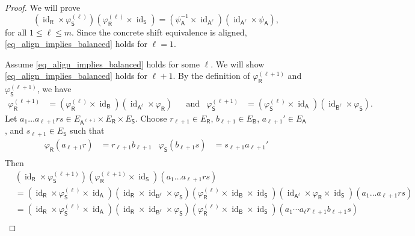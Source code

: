 \documentclass[11pt, letterpaper,final]{amsart}
\newcommand{\id}{\operatorname{id}}
\theoremstyle{definition}
\begin{document}
\begin{proof}
We will prove
\begin{equation}\label{eq_align_implies_balanced}
 (\id_\mathsf{R} \times \varphi_\mathsf{S}^{(\ell)}) (\varphi_\mathsf{R}^{(\ell)} \times\id_\mathsf{S})=(\psi_\mathsf{A}^{-1} \times \id_{\mathsf{A}^\ell})(\id_{\mathsf{A}^\ell} \times \psi_\mathsf{A}),
\end{equation}
for all $1 \leq \ell \leq m$.  Since the concrete shift equivalence is aligned, \eqref{eq_align_implies_balanced} holds for $\ell=1$.  

Assume \eqref{eq_align_implies_balanced} holds for some $\ell$.  We will show \eqref{eq_align_implies_balanced} holds for $\ell+1$.  By the definition of $\varphi_\mathsf{R}^{(\ell+1)}$ and $\varphi_\mathsf{S}^{(\ell+1)}$, we have 
\begin{align*}
\varphi_\mathsf{R}^{(\ell+1)} &= (\varphi_\mathsf{R}^{ (\ell) } \times \id_\mathsf{B} ) ( \id_{\mathsf{A}^\ell} \times \varphi_\mathsf{R})  & & \text{and} &  \varphi_\mathsf{S}^{(\ell+1)} &= (\varphi_\mathsf{S}^{ (\ell) } \times \id_\mathsf{A} ) ( \id_{\mathsf{B}^\ell} \times \varphi_\mathsf{S}).
\end{align*}
Let $a_1\ldots a_{\ell+1} rs \in E_{\mathsf{A}^{\ell+1} } \times E_\mathsf{R} \times E_\mathsf{S}$.  Choose $r_{\ell+1}\in E_{\mathsf{R}}$, $b_{\ell+1} \in E_\mathsf{B}$, $a_{\ell+1} ' \in E_\mathsf{A}$,  and $ s_{\ell+1} \in E_\mathsf{S}$ such that 
\begin{align*}
\varphi_\mathsf{R}( a_{\ell+1} r) &= r_{\ell+1} b_{\ell+1}  & \varphi_\mathsf{S} ( b_{\ell+1} s ) &= s_{\ell+1} a_{\ell+1}' \\
\end{align*}
Then 
\begin{align*}
&(\id_\mathsf{R} \times \varphi_\mathsf{S}^{(\ell+1)})(\varphi_\mathsf{R}^{(\ell+1)} \times\id_\mathsf{S}) (a_1\ldots a_{\ell+1} rs )\\
&= (\id_\mathsf{R} \times \varphi_\mathsf{S}^{ (\ell) } \times \id_\mathsf{A} )  (\id_\mathsf{R} \times \id_{\mathsf{B}^\ell } \times \varphi_\mathsf{S} )(\varphi_\mathsf{R}^{ (\ell) } \times \id_\mathsf{B}  \times\id_\mathsf{S}) ( \id_{\mathsf{A}^\ell} \times \varphi_\mathsf{R} \times\id_\mathsf{S}) (a_1\ldots a_{\ell+1} rs ) \\
&= (\id_\mathsf{R} \times \varphi_\mathsf{S}^{ (\ell) } \times \id_\mathsf{A} )  (\id_\mathsf{R} \times \id_{\mathsf{B}^\ell } \times \varphi_\mathsf{S} )(\varphi_\mathsf{R}^{ (\ell) } \times \id_\mathsf{B}  \times\id_\mathsf{S}) (a_1 \cdots a_\ell r_{\ell+1} b_{\ell+1}s) \\

\end{align*}
\end{proof}
\end{document}
